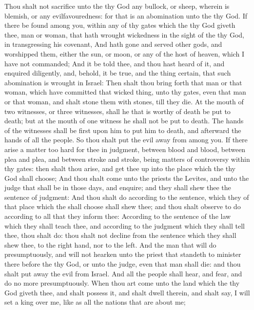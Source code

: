 \begin{biblechapter} %
\verse Thou shalt not sacrifice unto the \LORD thy God any bullock, or sheep, wherein is blemish, or any evilfavouredness: for that is an abomination unto the \LORD thy God.
\verse If there be found among you, within any of thy gates which the \LORD thy God giveth thee, man or woman, that hath wrought wickedness in the sight of the \LORD thy God, in transgressing his covenant,
\verse And hath gone and served other gods, and worshipped them, either the sun, or moon, or any of the host of heaven, which I have not commanded;
\verse And it be told thee, and thou hast heard of it, and enquired diligently, and, behold, it be true, and the thing certain, that such abomination is wrought in Israel:
\verse Then shalt thou bring forth that man or that woman, which have committed that wicked thing, unto thy gates, even that man or that woman, and shalt stone them with stones, till they die.
\verse At the mouth of two witnesses, or three witnesses, shall he that is worthy of death be put to death; but at the mouth of one witness he shall not be put to death.
\verse The hands of the witnesses shall be first upon him to put him to death, and afterward the hands of all the people. So thou shalt put the evil away from among you.
 If there arise a matter too hard for thee in judgment, between blood and blood, between plea and plea, and between stroke and stroke, being matters of controversy within thy gates: then shalt thou arise, and get thee up into the place which the \LORD thy God shall choose;
\verse And thou shalt come unto the priests the Levites, and unto the judge that shall be in those days, and enquire; and they shall shew thee the sentence of judgment:
\verse And thou shalt do according to the sentence, which they of that place which the \LORD shall choose shall shew thee; and thou shalt observe to do according to all that they inform thee:
\verse According to the sentence of the law which they shall teach thee, and according to the judgment which they shall tell thee, thou shalt do: thou shalt not decline from the sentence which they shall shew thee, to the right hand, nor to the left.
\verse And the man that will do presumptuously, and will not hearken unto the priest that standeth to minister there before the \LORD thy God, or unto the judge, even that man shall die: and thou shalt put away the evil from Israel.
\verse And all the people shall hear, and fear, and do no more presumptuously.
 When thou art come unto the land which the \LORD thy God giveth thee, and shalt possess it, and shalt dwell therein, and shalt say, I will set a king over me, like as all the nations that are about me;

\end{biblechapter}
